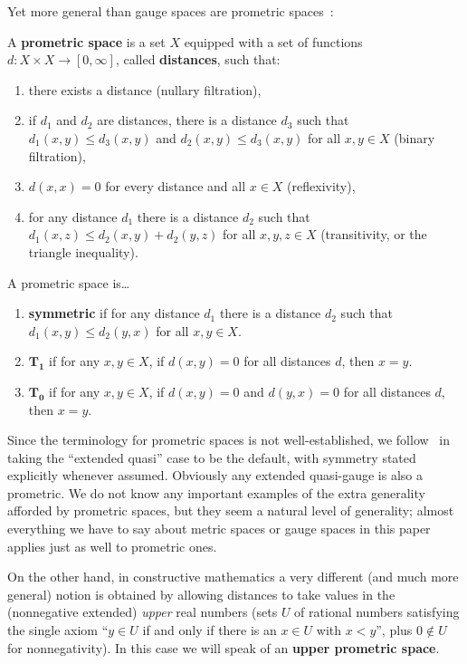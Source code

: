 \documentclass{article}
\def\Rp{[0,\infty]}
\begin{document}
Yet more general than gauge spaces are prometric spaces~\cite{cht:one-setting}:

\begin{defn}
  A \textbf{prometric space} is a set $X$ equipped with a set of functions $d:X\times X\to\Rp$, called \textbf{distances}, such that:
  \begin{enumerate}
  \item there exists a distance (nullary filtration),
  \item if $d_1$ and $d_2$ are distances, there is a distance $d_3$ such that $d_1(x,y)\le d_3(x,y)$ and $d_2(x,y)\le d_3(x,y)$ for all $x,y\in X$ (binary filtration),
  \item $d(x,x)=0$ for every distance and all $x\in X$ (reflexivity),
  \item for any distance $d_1$ there is a distance $d_2$ such that $d_1(x,z)\le d_2(x,y)+d_2(y,z)$ for all $x,y,z\in X$ (transitivity, or the triangle inequality).
  \end{enumerate}
  A prometric space is\dots
  \begin{enumerate}[resume]
  \item \textbf{symmetric} if for any distance $d_1$ there is a distance $d_2$ such that $d_1(x,y)\le d_2(y,x)$ for all $x,y\in X$.
  \item $\mathbf{T_1}$ if for any $x,y\in X$, if $d(x,y)=0$ for all distances $d$, then $x=y$.
  \item $\mathbf{T_0}$ if for any $x,y\in X$, if $d(x,y)=0$ and $d(y,x)=0$ for all distances $d$, then $x=y$.
  \end{enumerate}
\end{defn}

Since the terminology for prometric spaces is not well-established, we follow~\cite{cht:one-setting} in taking the ``extended quasi'' case to be the default, with symmetry stated explicitly whenever assumed.
Obviously any extended quasi-gauge is also a prometric.
We do not know any important examples of the extra generality afforded by prometric spaces, but they seem a natural level of generality; almost everything we have to say about metric spaces or gauge spaces in this paper applies just as well to prometric ones.

On the other hand, in constructive mathematics a very different (and much more general) notion is obtained by allowing distances to take values in the (nonnegative extended) \emph{upper} real numbers (sets $U$ of rational numbers satisfying the single axiom ``$y\in U$ if and only if there is an $x\in U$ with $x<y$'', plus $0\notin U$ for nonnegativity).
In this case we will speak of an \textbf{upper prometric space}.
\end{document}
